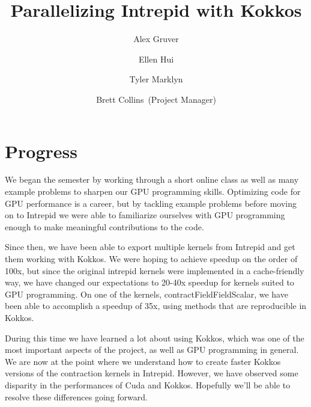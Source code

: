 \documentclass[midyear]{hmcclinic}
\title{Parallelizing Intrepid with Kokkos}
\author{Alex Gruver \and Ellen Hui \and Tyler Marklyn \and Brett Collins~(Project Manager)}
\begin{document}





\maketitle

\mainmatter




\section*{Progress}
We began the semester by working through a short online class as well as many example
problems to sharpen our GPU programming skills. Optimizing code for GPU
performance is a career, but by tackling example problems before moving on to
Intrepid we were able to familiarize ourselves with GPU programming enough to
make meaningful contributions to the code.

Since then, we have been able to export multiple kernels from Intrepid and get
them working with Kokkos. We were hoping to achieve speedup on the order of 100x, but
since the original intrepid kernels were implemented in a cache-friendly way, we
have changed our expectations to 20-40x speedup for kernels suited to GPU programming. 
On one of the kernels, contractFieldFieldScalar, we have been able to accomplish a speedup
of 35x, using methods that are reproducible in Kokkos. 

During this time we have learned a lot about using
Kokkos, which was one of the most important aspects of the project, as well as
GPU programming in general. We are now at the point where we
understand how to create faster Kokkos versions of the contraction kernels in
Intrepid. However, we have observed some disparity in the performances of Cuda and
Kokkos. Hopefully we'll be able to resolve these differences going forward.
\end{document}
